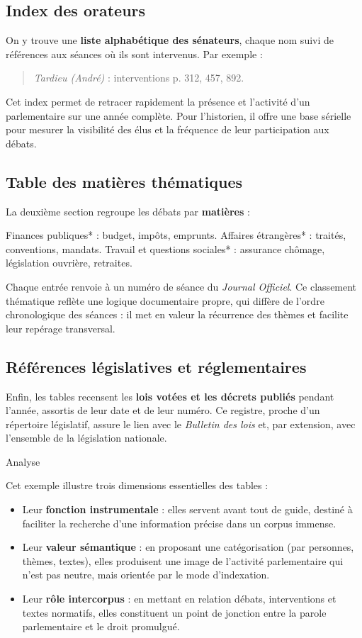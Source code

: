 \subsection{Index des orateurs}

On y trouve une \textbf{liste alphabétique des sénateurs}, chaque nom suivi de références aux séances où ils sont intervenus. Par exemple :

\begin{quote}
\emph{Tardieu (André)} : interventions p. 312, 457, 892.

\end{quote}
Cet index permet de retracer rapidement la présence et l’activité d’un parlementaire sur une année complète. Pour l’historien, il offre une base sérielle pour mesurer la visibilité des élus et la fréquence de leur participation aux débats.

\subsection{Table des matières thématiques}

La deuxième section regroupe les débats par \textbf{matières} :

\emph{ }Finances publiques* : budget, impôts, emprunts.
\emph{ }Affaires étrangères* : traités, conventions, mandats.
\emph{ }Travail et questions sociales* : assurance chômage, législation ouvrière, retraites.

Chaque entrée renvoie à un numéro de séance du \emph{Journal Officiel}. Ce classement thématique reflète une logique documentaire propre, qui diffère de l’ordre chronologique des séances : il met en valeur la récurrence des thèmes et facilite leur repérage transversal.

\subsection{Références législatives et réglementaires}

Enfin, les tables recensent les \textbf{lois votées et les décrets publiés} pendant l’année, assortis de leur date et de leur numéro. Ce registre, proche d’un répertoire législatif, assure le lien avec le \emph{Bulletin des lois} et, par extension, avec l’ensemble de la législation nationale.

 Analyse

Cet exemple illustre trois dimensions essentielles des tables :

\begin{itemize}
\item Leur \textbf{fonction instrumentale} : elles servent avant tout de guide, destiné à faciliter la recherche d’une information précise dans un corpus immense.
\item Leur \textbf{valeur sémantique} : en proposant une catégorisation (par personnes, thèmes, textes), elles produisent une image de l’activité parlementaire qui n’est pas neutre, mais orientée par le mode d’indexation.
\item Leur \textbf{rôle intercorpus} : en mettant en relation débats, interventions et textes normatifs, elles constituent un point de jonction entre la parole parlementaire et le droit promulgué.
\end{itemize}
